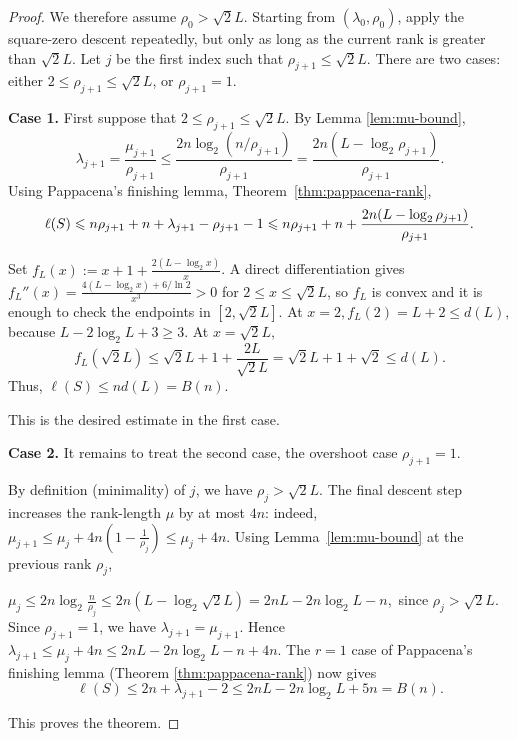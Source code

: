 \documentclass[11pt]{article}
\renewcommand{\geq}{\geqslant}
\renewcommand{\leq}{\leqslant}
\newtheorem{auxiliary proposition}[theorem]{Auxiliary Proposition}
\newtheorem{main conjecture}[theorem]{Main Conjecture}
\newtheorem{main theorem}[theorem]{Main Theorem}
\newtheorem{modesty proposition}[theorem]{Modesty Proposition}
\newtheorem{open problem}[theorem]{Open Problem}
\newtheorem{convergence lemma}[theorem]{Convergence Lemma}
\newtheorem{corrected lemma}[theorem]{Corrected Lemma}
\newtheorem{growth lemma}[theorem]{Growth Lemma}
\newtheorem{coefficient lemma}[theorem]{Integrality Lemma}
\newtheorem{interpolation lemma}[theorem]{Interpolation Lemma}
\newtheorem{kernel lemma}[theorem]{Kernel Lemma}
\newtheorem{limit lemma}[theorem]{Limit Lemma}
\newtheorem{tandem lemma}[theorem]{Modesty Lemma}
\newtheorem{zero-finding lemma}[theorem]{Zero-Finding Lemma}
\numberwithin{equation}{section}
\begin{document}
\begin{proof}

We therefore assume $\rho_0>\sqrt2 L$. Starting from $(\lambda_0,\rho_0)$, apply the square-zero descent repeatedly, but only as long as the current rank is greater than $\sqrt2 L$.  %
Let $j$ be the first index such that $\rho_{j+1}\leq \sqrt2 L.$
There are two cases: either $2\leq \rho_{j+1}\leq \sqrt2 L$, or $\rho_{j+1}=1$.

\textbf{Case 1.} First suppose that $2\leq \rho_{j+1}\leq \sqrt2 L.$
By Lemma \ref{lem:mu-bound},
$$\lambda_{j+1}=\frac{\mu_{j+1}}{\rho_{j+1}}\leq\frac{2n\log_2(n/\rho_{j+1})}{\rho_{j+1}} =\frac{2n(L-\log_2\rho_{j+1})}{\rho_{j+1}}.$$
Using Pappacena's finishing lemma, Theorem~\ref{thm:pappacena-rank},
$$\ell(S)\leq n\rho_{j+1}+n+\lambda_{j+1}-\rho_{j+1}-1 \\\leq n\rho_{j+1}+n+\frac{2n(L-\log_2\rho_{j+1})}{\rho_{j+1}}.$$

Set $f_L(x):=x+1+\frac{2(L-\log_2 x)}{x}$. A direct differentiation gives $f_L''(x) =\frac{4(L-\log_2x)+6/\ln2}{x^3}>0$ for $2\leq x\leq \sqrt2 L$,
so $f_L$ is convex and it is enough to check the endpoints in $[2,\sqrt2 L]$.  At
$x=2,f_L(2)=L+2\leq d(L),$
because $L-2\log_2L+3\geq3$.  At $x=\sqrt2 L,$ $$f_L(\sqrt2 L)\leq \sqrt2 L+1+\frac{2L}{\sqrt2 L}=\sqrt2 L+1+\sqrt2\leq d(L).$$
Thus, $\ell(S)\leq nd(L)=B(n)$.



This is the desired estimate in the first case.

\textbf{Case 2.} It remains to treat the second case, the overshoot case $\rho_{j+1}=1.$

  By definition (minimality) of ${j}$, we have $\rho_j>\sqrt{2}L$.  The final descent step increases the rank-length $\mu$ by at most $4n$: indeed,
$\mu_{j+1}\leq\mu_{j}+4n\left(1-\frac{1}{\rho_j}\right)\leq\mu_{j}+4n.$
Using Lemma~\ref{lem:mu-bound} at the previous rank $\rho_j$,

$\mu_{j}\leq2n\log_2\frac{n}{\rho_j}\leq2n(L-\log_2 \sqrt2 L)=2nL-2n\log_2L-n,$
since $\rho_j>\sqrt2 L$. 
Since $\rho_{j+1}=1$, we have $\lambda_{j+1}=\mu_{j+1}$.  Hence
$\lambda_{j+1}\leq \mu_j+4n\leq 2nL-2n\log_2L-n+4n.$
The $r=1$ case of Pappacena's finishing lemma (Theorem \ref{thm:pappacena-rank}) now gives $$\ell(S)\leq2n+\lambda_{j+1}-2\leq2nL-2n\log_2 L+5n=B(n).$$

This proves the theorem.

\end{proof}
\end{document}
